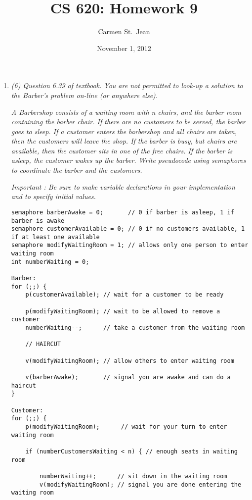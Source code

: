 \documentclass[letterpaper,11pt]{article}
\begin{document}
\title{CS 620: Homework 9}
\date{November 1, 2012}
\author{Carmen St.\ Jean}

\maketitle

\begin{enumerate}
\item \emph{(6) Question 6.39 of textbook. You are not permitted to look-up a solution to the Barber's problem on-line (or anywhere else).}

\emph{A Barbershop consists of a waiting room with n chairs, and the barber room containing the
barber chair. If there are no customers to be served, the barber goes to sleep. If a customer
enters the barbershop and all chairs are taken, then the customers will leave the shop. If the
barber is busy, but chairs are available, then the customer sits in one of the free chairs. If the
barber is asleep, the customer wakes up the barber. Write pseudocode using semaphores to
coordinate the barber and the customers.}

\emph{Important : Be sure to make variable declarations in your implementation and to specify
initial values.}

\begin{verbatim}
semaphore barberAwake = 0;       // 0 if barber is asleep, 1 if barber is awake
semaphore customerAvailable = 0; // 0 if no customers available, 1 if at least one available
semaphore modifyWaitingRoom = 1; // allows only one person to enter waiting room 
int numberWaiting = 0;

Barber:
for (;;) {
    p(customerAvailable); // wait for a customer to be ready

    p(modifyWaitingRoom); // wait to be allowed to remove a customer
    numberWaiting--;      // take a customer from the waiting room

    // HAIRCUT

    v(modifyWaitingRoom); // allow others to enter waiting room

    v(barberAwake);       // signal you are awake and can do a haircut
}

Customer:
for (;;) {
    p(modifyWaitingRoom);      // wait for your turn to enter waiting room

    if (numberCustomersWaiting < n) { // enough seats in waiting room 

        numberWaiting++;      // sit down in the waiting room
        v(modifyWaitingRoom); // signal you are done entering the waiting room


\end{verbatim}
\end{enumerate}
\end{document}
